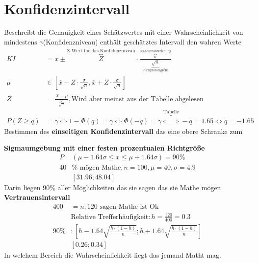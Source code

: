 \section{Konfidenzintervall}
Beschreibt die Genauigkeit eines Schätzwertes mit einer Wahrscheinlichkeit von mindestens $\gamma$(Konfidenzniveau) enthält geschätztes Intervall den wahren Werte
\begin{align*}
    KI &= \overline{x} \pm \overbrace{Z}^{\textrm{Z-Wert für das Konfidenzniveau}} \cdot \frac{\overbrace{\sigma}^{\textrm{Standardabweichung}}}{\underbrace{\sqrt{n}}_{\textrm{Stichprobengröße}} }\\
    \mu& \in \left[\overline{x}-Z\cdot \frac{\sigma}{\sqrt{n}},\overline{x}+Z\cdot \frac{\sigma}{\sqrt{n}}\right] \\
    Z &=\frac{\overline{X}-\mu}{\frac{\sigma}{\sqrt{n}}},\textrm{Wird aber meinst aus der Tabelle abgelesen}\\
    P(Z\geq q)&= \gamma \Leftrightarrow 1-\Phi (q)= \gamma \Leftrightarrow \Phi (-q) =\gamma \overbrace{\Leftrightarrow}^{\textrm{Tabelle}}-q = 1.65 \Leftrightarrow q = -1.65 
\end{align*}
Bestimmen des \textbf{einseitigen Konfidenzintervall} das eine obere Schranke zum 


\textbf{Sigmaumgebung mit einer festen prozentualen Richtgröße}
\begin{align*}
    P&(\mu -1.64 \sigma \leq x\leq \mu+1.64\sigma) = 90\%\\
    40&\%\textrm{ mögen Mathe}, n=100, \mu = 40, \sigma = 4.9\\
    &[31.96; 48.04]
\end{align*}
Darin liegen 90\% aller Möglichkeiten das sie sagen das sie Mathe mögen\\
\textbf{Vertrauensintervall}
\begin{align*}
    400 &= n; 120 \textrm{ sagen Mathe ist Ok}\\
    &\textrm{Relative Trefferhäufigkeit}: h= \frac{120}{400} = 0.3\\
    90\%&:\left[ h-1.64\sqrt{\frac{h\cdot(1-h)}{n}};h+ 1.64\sqrt{\frac{h\cdot(1-h)}{n}}\right]\\
    &[0.26;0.34]
\end{align*}
In welchem Bereich die Wahrscheinlichkeit liegt das jemand Matht mag.

